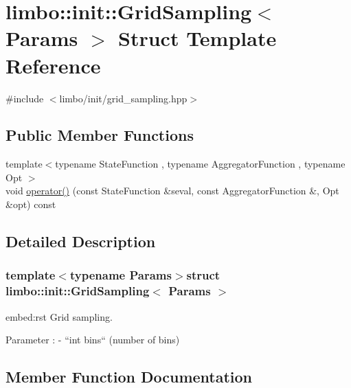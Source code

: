 \hypertarget{structlimbo_1_1init_1_1_grid_sampling}{}\section{limbo\+:\+:init\+:\+:Grid\+Sampling$<$ Params $>$ Struct Template Reference}
\label{structlimbo_1_1init_1_1_grid_sampling}


{\ttfamily \#include $<$limbo/init/grid\+\_\+sampling.\+hpp$>$}

\subsection*{Public Member Functions}
\begin{DoxyCompactItemize}
\item 
{\footnotesize template$<$typename State\+Function , typename Aggregator\+Function , typename Opt $>$ }\\void \hyperlink{structlimbo_1_1init_1_1_grid_sampling_a9b17fba72e1ae09a3361e9dcb8ff3fe3}{operator()} (const State\+Function \&seval, const Aggregator\+Function \&, Opt \&opt) const 
\end{DoxyCompactItemize}


\subsection{Detailed Description}
\subsubsection*{template$<$typename Params$>$struct limbo\+::init\+::\+Grid\+Sampling$<$ Params $>$}

\begin{DoxyVerb}embed:rst
Grid sampling.

Parameter :
  - ``int bins`` (number of bins)
\end{DoxyVerb}
 

\subsection{Member Function Documentation}
\hypertarget{structlimbo_1_1init_1_1_grid_sampling_a9b17fba72e1ae09a3361e9dcb8ff3fe3}{}
